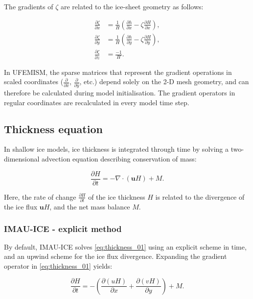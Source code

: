 \documentclass{article}
\begin{document}
The gradients of $\zeta$ are related to the ice-sheet geometry as follows:

\begin{align} \label{BPA_06}
\frac{\partial \zeta}{\partial x} &= \frac{1}{H} \left( \frac{\partial h}{\partial x} -
\zeta \frac{\partial H}{\partial x} \right), \\
\frac{\partial \zeta}{\partial y} &= \frac{1}{H} \left( \frac{\partial h}{\partial y} -
\zeta \frac{\partial H}{\partial y} \right), \\
\frac{\partial \zeta}{\partial z} &= \frac{-1}{H}.
\end{align}

In UFEMISM, the sparse matrices that represent the gradient operations in scaled coordinates ($\frac{\partial}{\partial \hat{x}}$, $\frac{\partial}{\partial \hat{y}}$, etc.) depend solely on the 2-D mesh geometry, and can therefore be calculated during model initialisation. The gradient operators in regular coordinates are recalculated in every model time step.

\newpage
\subsection{Thickness equation}

In shallow ice models, ice thickness is integrated through time by solving a two-dimensional advection equation describing conservation of mass:

\begin{equation} \label{eq:thickness_01}
\frac{\partial H}{\partial t} = -\nabla \cdot \left( \textbf{u} H \right) + M.
\end{equation}

Here, the rate of change $\frac{\partial H}{\partial t}$ of the ice thickness $H$ is related to the divergence of the ice flux $\textbf{u} H$, and the net mass balance $M$.

\subsubsection{IMAU-ICE - explicit method}

By default, IMAU-ICE solves \eqref{eq:thickness_01} using an explicit scheme in time, and an upwind scheme for the ice flux divergence. Expanding the gradient operator in \eqref{eq:thickness_01} yields:

\begin{equation} \label{eq:thickness_02}
\frac{\partial H}{\partial t} = -\left( \frac{\partial \left( u H\right) }{\partial x} + \frac{\partial \left( v H\right) }{\partial y} \right) + M.
\end{equation}
\end{document}

